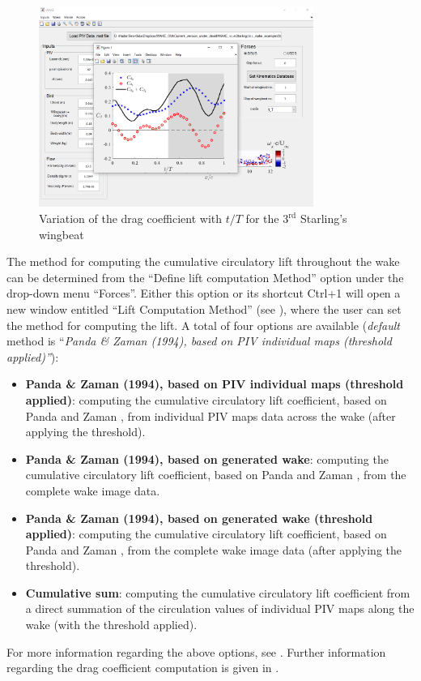 \documentclass[12pt,a4paper]{article}
\begin{document}
\begin{figure}[ht!]
	\centering
	\includegraphics[width=0.8\textwidth]{drag-plot}
	\caption{Variation of the drag coefficient with $t/T$ for the $3^\mathrm{rd}$ Starling's wingbeat}
	\label{fig:GUI-drag-plot}
\end{figure}

\newpage
The method for computing the cumulative circulatory lift throughout the wake can be determined from the ``Define lift computation Method'' option under the drop-down menu ``Forces''. 
Either this option or its shortcut Ctrl+1 will open a new window entitled ``Lift Computation Method'' (see ), where the user can set the method for computing the lift. A total of four options are available (\textit{default} method is ``\textit{Panda \& Zaman (1994), based on PIV individual maps (threshold applied)''}):
\begin{itemize}
	\item \textbf{Panda \& Zaman (1994), based on PIV individual maps (threshold applied)}: computing the cumulative circulatory lift coefficient, based on Panda and Zaman \cite{Panda1994}, from individual PIV maps data across the wake (after applying the threshold).
	\item \textbf{Panda \& Zaman (1994), based on generated wake}: computing the cumulative circulatory lift coefficient, based on Panda and Zaman \cite{Panda1994}, from the complete wake image data.
	\item \textbf{Panda \& Zaman (1994), based on generated wake (threshold applied)}: computing the cumulative circulatory lift coefficient, based on Panda and Zaman \cite{Panda1994}, from the complete wake image data (after applying the threshold).
	\item \textbf{Cumulative sum}: computing the cumulative circulatory lift coefficient from a direct summation of the circulation values of individual PIV maps along the wake (with the threshold applied).   
\end{itemize}
For more information regarding the above options, see . Further information regarding the drag coefficient computation is given in .
\end{document}
